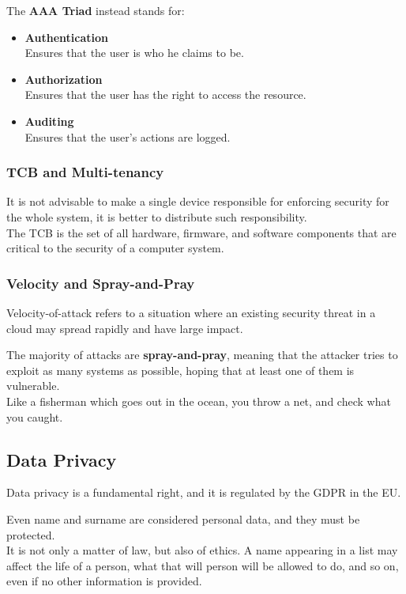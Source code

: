 The \textbf{AAA Triad} instead stands for:
\begin{itemize}
   \item \textbf{Authentication}\\
   Ensures that the user is who he claims to be.
   \item \textbf{Authorization}\\
   Ensures that the user has the right to access the resource.
   \item \textbf{Auditing}\\
   Ensures that the user's actions are logged.
\end{itemize}

\subsubsection{TCB and Multi-tenancy}
It is not advisable to make a single device responsible for enforcing security for the whole system, it is better to distribute such responsibility.\\
The TCB is the set of all hardware, firmware, and software components that are critical to the security of a computer system.

\subsubsection{Velocity and Spray-and-Pray}
Velocity-of-attack refers to a situation where an existing security threat in a cloud may spread rapidly and have large impact.

The majority of attacks are \textbf{spray-and-pray}, meaning that the attacker tries to exploit as many systems as possible, hoping that at least one of them is vulnerable.\\
Like a fisherman which goes out in the ocean, you throw a net, and check what you caught.

\subsection{Data Privacy}
Data privacy is a fundamental right, and it is regulated by the GDPR in the EU.

Even name and surname are considered personal data, and they must be protected.\\
It is not only a matter of law, but also of ethics.
A name appearing in a list may affect the life of a person, what that will person will be allowed to do, and so on, even if no other information is provided.

